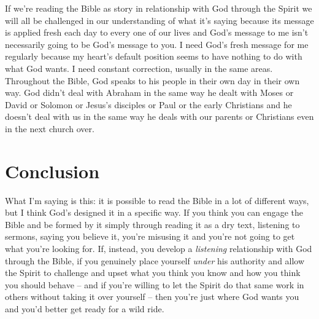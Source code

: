 If we're reading the Bible as story in relationship with God through the Spirit
we will all be challenged in our understanding of what it's saying because its
message is applied fresh each day to every one of our lives and God's message to
me isn't necessarily going to be God's message to you. I need God's fresh
message for me regularly because my heart's default position seems to have
nothing to do with what God wants. I need constant correction, usually in the
same areas. Throughout the Bible, God speaks to his people in their own day in
their own way. God didn't deal with Abraham in the same way he dealt with Moses
or David or Solomon or Jesus's disciples or Paul or the early Christians and he
doesn't deal with us in the same way he deals with our parents or Christians
even in the next church over.

\section{Conclusion}

What I'm saying is this: it is possible to read the Bible in a lot of different
ways, but I think God's designed it in a specific way. If you think you can
engage the Bible and be formed by it simply through reading it as a dry text,
listening to sermons, saying you believe it, you're misusing it and you're not
going to get what you're looking for. If, instead, you develop a
\textit{listening} relationship with God through the Bible, if you genuinely
place yourself \textit{under} his authority and allow the Spirit to challenge
and upset what you think you know and how you think you should behave -- and if
you're willing to let the Spirit do that same work in others without taking it
over yourself -- then you're just where God wants you and you'd better get ready
for a wild ride.


